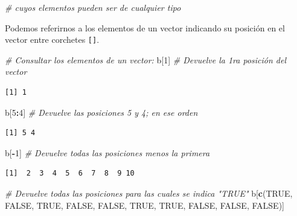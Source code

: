 \documentclass[12pt,spanish,]{book}
\newenvironment{Shaded}{\begin{snugshade}}{\end{snugshade}}
\newcommand{\CommentTok}[1]{\textcolor[rgb]{0.56,0.35,0.01}{\textit{#1}}}
\newcommand{\DecValTok}[1]{\textcolor[rgb]{0.00,0.00,0.81}{#1}}
\newcommand{\KeywordTok}[1]{\textcolor[rgb]{0.13,0.29,0.53}{\textbf{#1}}}
\newcommand{\NormalTok}[1]{#1}
\newcommand{\OperatorTok}[1]{\textcolor[rgb]{0.81,0.36,0.00}{\textbf{#1}}}
\newcommand{\OtherTok}[1]{\textcolor[rgb]{0.56,0.35,0.01}{#1}}
\begin{document}
\begin{Shaded}
\begin{Highlighting}[]
                           \CommentTok{#   cuyos elementos pueden ser de cualquier tipo}
\end{Highlighting}
\end{Shaded}

Podemos referirnos a los elementos de un vector indicando su posición en el vector entre corchetes \texttt{{[}{]}}.

\begin{Shaded}
\begin{Highlighting}[]
\CommentTok{# Consultar los elementos de un vector:}
\NormalTok{b[}\DecValTok{1}\NormalTok{]                   }\CommentTok{# Devuelve la 1ra posición del vector}
\end{Highlighting}
\end{Shaded}

\begin{verbatim}
[1] 1
\end{verbatim}

\begin{Shaded}
\begin{Highlighting}[]
\NormalTok{b[}\DecValTok{5}\OperatorTok{:}\DecValTok{4}\NormalTok{]                 }\CommentTok{# Devuelve las posiciones 5 y 4; en ese orden}
\end{Highlighting}
\end{Shaded}

\begin{verbatim}
[1] 5 4
\end{verbatim}

\begin{Shaded}
\begin{Highlighting}[]
\NormalTok{b[}\OperatorTok{-}\DecValTok{1}\NormalTok{]                  }\CommentTok{# Devuelve todas las posiciones menos la primera}
\end{Highlighting}
\end{Shaded}

\begin{verbatim}
[1]  2  3  4  5  6  7  8  9 10
\end{verbatim}

\begin{Shaded}
\begin{Highlighting}[]
\CommentTok{# Devuelve todas las posiciones para las cuales se indica "TRUE"}
\NormalTok{b[}\KeywordTok{c}\NormalTok{(}\OtherTok{TRUE}\NormalTok{, }\OtherTok{FALSE}\NormalTok{, }\OtherTok{TRUE}\NormalTok{, }\OtherTok{FALSE}\NormalTok{, }\OtherTok{FALSE}\NormalTok{, }\OtherTok{TRUE}\NormalTok{, }\OtherTok{TRUE}\NormalTok{, }\OtherTok{FALSE}\NormalTok{, }\OtherTok{FALSE}\NormalTok{, }\OtherTok{FALSE}\NormalTok{)]  }
\end{Highlighting}
\end{Shaded}
\end{document}
